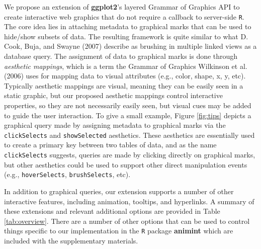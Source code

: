\documentclass[12pt,]{article}
\theoremstyle{definition}
\theoremstyle{definition}
\theoremstyle{definition}
\theoremstyle{remark}
\begin{document}
We propose an extension of \textbf{ggplot2}'s layered Grammar of
Graphics API to create interactive web graphics that do not require a
callback to server-side \texttt{R}. The core idea lies in attaching
metadata to graphical marks that can be used to hide/show subsets of
data. The resulting framework is quite similar to what D. Cook, Buja,
and Swayne (2007) describe as brushing in multiple linked views as a
database query. The assignment of data to graphical marks is done
through \emph{aesthetic mappings}, which is a term the Grammar of
Graphics Wilkinson et al. (2006) uses for mapping data to visual
attributes (e.g., color, shape, x, y, etc). Typically aesthetic mappings
are visual, meaning they can be easily seen in a static graphic, but our
proposed aesthetic mappings control interactive properties, so they are
not necessarily easily seen, but visual cues may be added to guide the
user interaction. To give a small example, Figure \ref{fig:tips} depicts
a graphical query made by assigning metadata to graphical marks via the
\texttt{clickSelects} and \texttt{showSelected} aesthetics. These
aesthetics are essentially used to create a primary key between two
tables of data, and as the name \texttt{clickSelects} suggests, queries
are made by clicking directly on graphical marks, but other aesthetics
could be used to support other direct manipulation events (e.g.,
\texttt{hoverSelects}, \texttt{brushSelects}, etc).

In addition to graphical queries, our extension supports a number of
other interactive features, including animation, tooltips, and
hyperlinks. A summary of these extensions and relevant additional
options are provided in Table \ref{tab:overview}. There are a number of
other options that can be used to control things specific to our
implementation in the \texttt{R} package \textbf{animint} which are
included with the supplementary materials.
\end{document}
